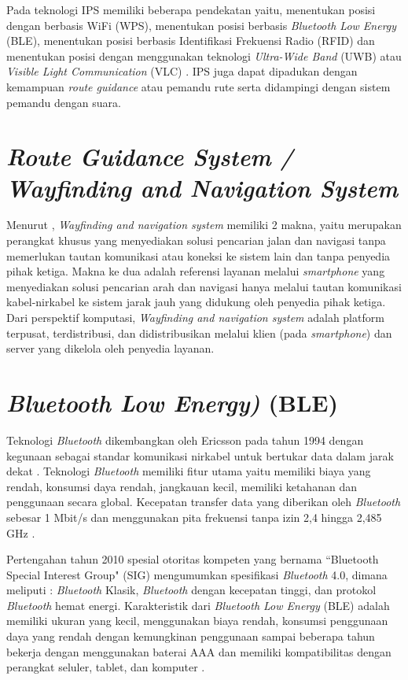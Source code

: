 \par Pada teknologi IPS memiliki beberapa pendekatan yaitu, menentukan posisi dengan berbasis WiFi (WPS), menentukan posisi berbasis \textit{Bluetooth Low Energy} (BLE), menentukan posisi berbasis Identifikasi Frekuensi Radio (RFID) dan menentukan posisi dengan menggunakan teknologi \textit{Ultra-Wide Band} (UWB) atau \textit{Visible Light Communication} (VLC) \citep{canton2017bluetooth}. IPS juga dapat dipadukan dengan kemampuan \textit{route guidance} atau pemandu rute serta didampingi dengan sistem pemandu dengan suara.


\section{\textit{Route Guidance System / Wayfinding and Navigation System}}
Menurut \citep{karimi2015indoor}, \textit{Wayfinding and navigation system} memiliki 2 makna, yaitu merupakan perangkat khusus yang menyediakan solusi pencarian jalan dan navigasi tanpa memerlukan tautan komunikasi atau koneksi ke sistem lain dan tanpa penyedia pihak ketiga. Makna ke dua adalah referensi layanan melalui \textit{smartphone} yang menyediakan solusi pencarian arah dan navigasi hanya melalui tautan komunikasi kabel-nirkabel ke sistem jarak jauh yang didukung oleh penyedia pihak ketiga. Dari perspektif komputasi, \textit{Wayfinding and navigation system} adalah platform terpusat, terdistribusi, dan didistribusikan melalui klien (pada \textit{smartphone}) dan server yang dikelola oleh penyedia layanan.

\section{\textit{Bluetooth Low Energy)} (BLE)}
Teknologi \textit{Bluetooth} dikembangkan oleh Ericsson pada tahun 1994 dengan kegunaan sebagai standar komunikasi nirkabel untuk bertukar data dalam jarak dekat \citep{kaluvza2017analysis}. Teknologi \textit{Bluetooth} memiliki fitur utama yaitu memiliki biaya yang rendah, konsumsi daya rendah, jangkauan kecil, memiliki ketahanan dan penggunaan secara global. Kecepatan transfer data yang diberikan oleh \textit{Bluetooth} sebesar 1 Mbit/s dan menggunakan pita frekuensi tanpa izin 2,4 hingga 2,485 GHz \citep{kaluvza2017analysis}.

\par Pertengahan tahun 2010 spesial otoritas kompeten yang bernama “Bluetooth Special Interest Group" (SIG) mengumumkan spesifikasi \textit{Bluetooth} 4.0, dimana meliputi : \textit{Bluetooth} Klasik, \textit{Bluetooth} dengan kecepatan tinggi, dan protokol \textit{Bluetooth} hemat energi. Karakteristik dari \textit{Bluetooth Low Energy} (BLE) adalah memiliki ukuran yang kecil, menggunakan biaya rendah, konsumsi penggunaan daya yang rendah dengan kemungkinan penggunaan sampai beberapa tahun bekerja dengan menggunakan baterai AAA dan memiliki kompatibilitas dengan perangkat seluler, tablet, dan komputer \citep{kaluvza2017analysis}.

